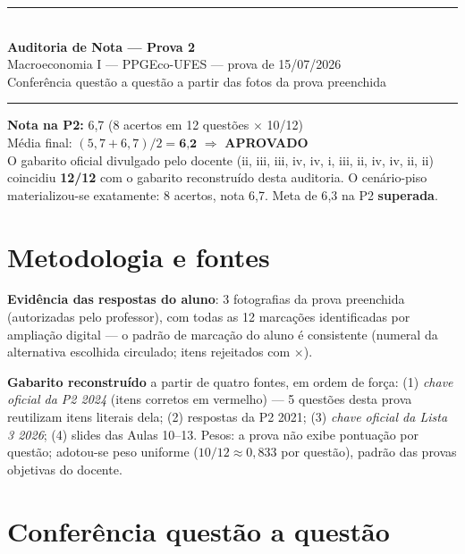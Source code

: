 \documentclass[12pt, a4paper]{article}
\begin{document}
\begin{center}
\rule{\linewidth}{1.2pt}\\[0.5em]
{\LARGE\bfseries\color{cyanrbc} Auditoria de Nota --- Prova 2}\\[0.3em]
{\large Macroeconomia I --- PPGEco-UFES --- prova de 15/07/2026}\\[0.3em]
{\normalsize\color{grayrbc} Conferência questão a questão a partir das fotos
da prova preenchida}\\[0.5em]
\rule{\linewidth}{1.2pt}
\end{center}

\begin{veredictobox}[title={RESULTADO FINAL --- CONFIRMADO PELO GABARITO OFICIAL (16/07/2026)}]
\centering
{\Large \textbf{Nota na P2: } {\huge 6{,}7}}\quad
{\large (8 acertos em 12 questões $\times$ 10/12)}\\[0.5em]
{\large Média final: $(5{,}7 + 6{,}7)/2 = \textbf{6{,}2}$
\;$\Rightarrow$\; \textbf{APROVADO}}\\[0.3em]
{\small O gabarito oficial divulgado pelo docente (ii, iii, iii, iv, iv, i,
iii, ii, iv, iv, ii, ii) coincidiu \textbf{12/12} com o gabarito
reconstruído desta auditoria. O cenário-piso materializou-se exatamente:
8 acertos, nota 6{,}7. Meta de 6{,}3 na P2 \textbf{superada}.}
\end{veredictobox}

\section{Metodologia e fontes}

\textbf{Evidência das respostas do aluno}: 3 fotografias da prova preenchida
(autorizadas pelo professor), com todas as 12 marcações identificadas por
ampliação digital --- o padrão de marcação do aluno é consistente (numeral da
alternativa escolhida circulado; itens rejeitados com $\times$).

\textbf{Gabarito reconstruído} a partir de quatro fontes, em ordem de força:
(1) \emph{chave oficial da P2 2024} (itens corretos em vermelho) --- 5 questões
desta prova reutilizam itens literais dela; (2) respostas da P2 2021;
(3) \emph{chave oficial da Lista 3 2026}; (4) slides das Aulas 10--13.
Pesos: a prova não exibe pontuação por questão; adotou-se peso uniforme
($10/12 \approx 0{,}833$ por questão), padrão das provas objetivas do docente.

\section{Conferência questão a questão}
\end{document}
